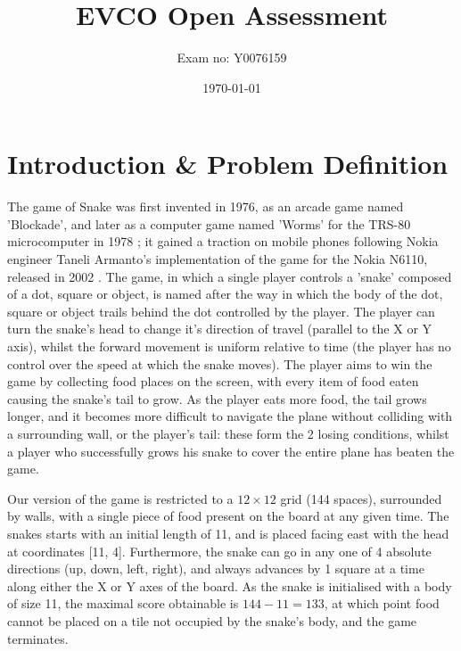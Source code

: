 \documentclass[british,10pt,a4paper]{article}
\begin{document}
\title{EVCO Open Assessment}
\author{Exam no: Y0076159}
\date{\today}
\maketitle
\clearpage
\tableofcontents
\clearpage
\listoffigures
\listoftables
\clearpage


\section{Introduction \& Problem Definition}

\begin{minipage}{0.7\textwidth}
The game of Snake was first invented in 1976, as an arcade game named 'Blockade', and later as a computer game named 'Worms' for the TRS-80 microcomputer in 1978 \cite{Goggin2010-ao}; it gained a traction on mobile phones following Nokia engineer Taneli Armanto's implementation of the game for the Nokia N6110, released in 2002 \cite{Goggin2010-ao}. The game, in which a single player controls a 'snake' composed of a dot, square or object, is named after the way in which the body of the dot, square or object trails behind the dot controlled by the player. The player can turn the snake's head to change it's direction of travel (parallel to the X or Y axis), whilst the forward movement is uniform relative to time (the player has no control over the speed at which the snake moves). The player aims to win the game by collecting food places on the screen, with every item of food eaten causing the snake's tail to grow. As the player eats more food, the tail grows longer, and it becomes more difficult to navigate the plane without colliding with a surrounding wall, or the player's tail: these form the 2 losing conditions, whilst a player who successfully grows his snake to cover the entire plane has beaten the game.  

Our version of the game is restricted to a $12\times12$ grid (144 spaces), surrounded by walls, with a single piece of food present on the board at any given time. The snakes starts with an initial length of 11, and is placed facing east with the head at coordinates [11, 4]. Furthermore, the snake can go in any one of 4 absolute directions (up, down, left, right), and always advances by 1 square at a time along either the X or Y axes of the board. As the snake is initialised with a body of size 11, the maximal score obtainable is $144-11=133$, at which point food cannot be placed on a tile not occupied by the snake's body, and the game terminates.
\end{minipage}
\end{document}
